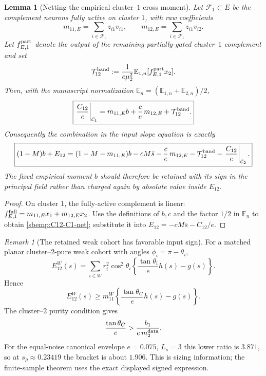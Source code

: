 \documentclass{article} %
\theoremstyle{plain}
\newtheorem{lemma}[theorem]{Lemma}
\theoremstyle{definition}
\theoremstyle{remark}
\newtheorem{remark}[theorem]{Remark}
\begin{document}
\begin{lemma}[Netting the empirical cluster--$1$ cross moment]
\label{sbemp:b-netting}
Let $\mathcal F_1\subset E$ be the complement neurons fully active on
cluster $1$, with raw coefficients
\[
 m_{11,E}=\sum_{i\in\mathcal F_1}z_{i1}v_{i1},\qquad
 m_{12,E}=\sum_{i\in\mathcal F_1}z_{i1}v_{i2}.
\]
Let $f_{E,1}^{\rm part}$ denote the output of the remaining partially-gated
cluster--$1$ complement and set
\[
 \mathcal T_{12}^{\rm band}
 :=\frac{1}{e\mu_2^2}
 \mathbb E_{1,n}[f_{E,1}^{\rm part}x_2].
\]
Then, with the manuscript normalization
$\mathbb E_n=(\mathbb E_{1,n}+\mathbb E_{2,n})/2$,
\begin{equation}\label{sbemp:C12-C1-net}
 \boxed{
 \left.\frac{C_{12}}e\right|_{\mathcal C_1}
 =m_{11,E}b+\frac ce\,m_{12,E}+\mathcal T_{12}^{\rm band}.
 }
\end{equation}
Consequently the combination in the input slope equation is exactly
\begin{equation}\label{sbemp:b-netted-input}
 \boxed{
 (1-M)b+E_{12}
 =(1-M-m_{11,E})b-cM\bar s
 -\frac ce\,m_{12,E}-\mathcal T_{12}^{\rm band}
 -\left.\frac{C_{12}}e\right|_{\mathcal C_2}.
 }
\end{equation}
The fixed empirical moment $b$ should therefore be retained with its sign
in the principal field rather than charged again by absolute value inside
$E_{12}$.
\end{lemma}
\begin{proof}
On cluster $1$, the fully-active complement is linear:
$f_{E,1}^{\rm full}=m_{11,E}x_1+m_{12,E}x_2$.
Use the definitions of $b,c$ and the factor $1/2$ in $\mathbb E_n$ to
obtain \eqref{sbemp:C12-C1-net}; substitute it into
$E_{12}=-cM\bar s-C_{12}/e$.
\end{proof}

\begin{remark}[The retained weak cohort has favorable input sign]
\label{sbemp:weak-E12-sign}
For a matched planar cluster--$2$-pure weak cohort with angles
$\phi_i=\pi-\theta_i$,
\[
 E_{12}^W(s)
 =\sum_{i\in W}r_i^2\cos^2\theta_i
 \left\{\frac{\tan\theta_i}{e}h(s)-g(s)\right\}.
\]
Hence
\[
 E_{12}^W(s)
 \ge m_{11}^W
 \left\{\frac{\tan\theta_G}{e}h(s)-g(s)\right\}.
\]
The cluster--$2$ purity condition gives
\[
 \frac{\tan\theta_G}{e}
 >\frac{b_1}{e\,m_2^{\rm data}}.
\]
For the equal-noise canonical envelope $e=0.075$, $L_s=3$ this lower
ratio is $3.871$, so at $s_\rho\approx0.23419$ the bracket is about
$1.906$.  This is sizing information; the finite-sample theorem uses the
exact displayed signed expression.
\end{remark}
\end{document}
